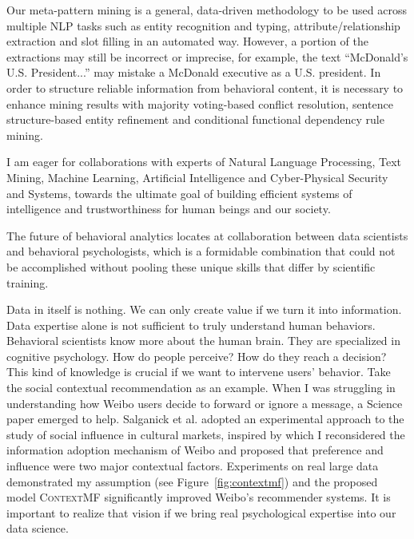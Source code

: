 \documentclass[10.5pt]{article}
\begin{document}
Our meta-pattern mining is a general, data-driven methodology to be used across multiple NLP tasks such as entity recognition and typing, attribute/relationship extraction and slot filling in an automated way. However, a portion of the extractions may still be incorrect or imprecise, for example, the text ``McDonald's U.S. President...'' may mistake a McDonald executive as a U.S. president. In order to structure reliable information from behavioral content, it is necessary to enhance mining results with majority voting-based conflict resolution, sentence structure-based entity refinement and conditional functional dependency rule mining.

\vskip 0.02in
 I am eager for collaborations with experts of Natural Language Processing, Text Mining, Machine Learning, Artificial Intelligence and Cyber-Physical Security and Systems, towards the ultimate goal of building efficient systems of intelligence and trustworthiness for human beings and our society.

\vskip 0.03in
\vskip 0.01in

The future of behavioral analytics locates at collaboration between data scientists and behavioral psychologists, which is a formidable combination that could not be accomplished without pooling these unique skills that differ by scientific training.

Data in itself is nothing. We can only create value if we turn it into information. Data expertise alone is not sufficient to truly understand human behaviors. Behavioral scientists know more about the human brain. They are specialized in cognitive psychology. How do people perceive? How do they reach a decision? This kind of knowledge is crucial if we want to intervene users' behavior. Take the social contextual recommendation as an example. When I was struggling in understanding how Weibo users decide to forward or ignore a message, a Science paper \cite{salganik2006experimental} emerged to help. Salganick et al. adopted an experimental approach to the study of social influence in cultural markets, inspired by which I reconsidered the information adoption mechanism of Weibo and proposed that preference and influence were two major contextual factors. Experiments on real large data demonstrated my assumption (see Figure~\ref{fig:contextmf}) and the proposed model \textsc{ContextMF} significantly improved Weibo's recommender systems. It is important to realize that vision if we bring real psychological expertise into our data science.
\end{document}
